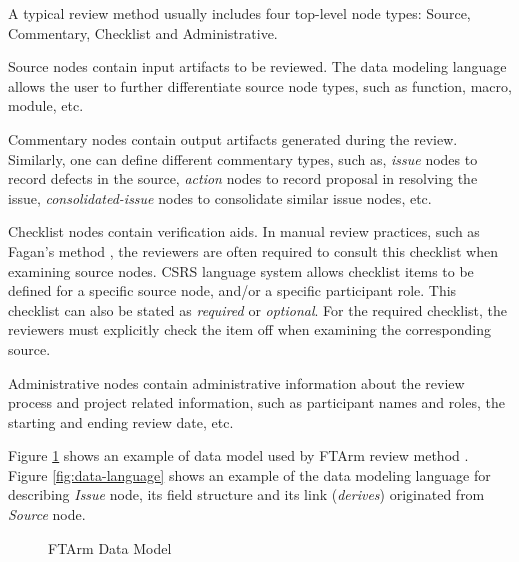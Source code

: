 A typical review method usually includes four top-level node
types: Source, Commentary, Checklist and Administrative.

Source nodes contain input artifacts to be reviewed. The data modeling
language allows the user to further differentiate source node types,
such as function, macro, module, etc. 

Commentary nodes contain output artifacts generated during the
review. Similarly, one can define different commentary types,
such as, {\it issue} nodes to record defects in the source,
{\it action} nodes to record proposal in resolving the issue, 
{\it consolidated-issue} nodes to consolidate similar issue nodes, etc.

Checklist nodes contain verification aids. In manual review practices,
such as Fagan's method \cite{Fagan76}, the reviewers are often required
to consult this checklist when examining source nodes. CSRS language
system allows checklist items to be defined for a specific source
node, and/or a specific participant role.
This checklist can also be stated as {\it required} or {\it optional}. 
For the required checklist, the reviewers
must explicitly check the item off when examining the corresponding
source. 

Administrative nodes contain administrative information about the
review process and project related information, such as participant names
and roles, the starting and ending review date, etc.

Figure \ref{fig:async-data-model} shows an example of data model used
by FTArm review method \cite{Johnson93,CSDL-93-17}. Figure
\ref{fig:data-language} 
shows an example of the data modeling language for describing
{\sl Issue} node, its field structure and its link ({\sl derives})
originated from {\sl Source} node.

\begin{figure}[h]
  \begin{center}
  \end{center}
  \caption{FTArm Data Model}
  \label{fig:async-data-model}
\end{figure}

